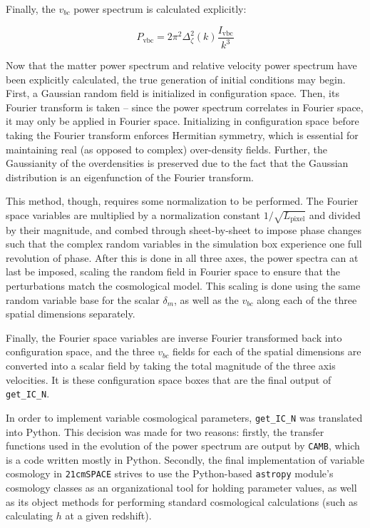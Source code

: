 \documentclass[floats,floatfix,showpacs,amssymb,prd,superscriptaddress,nofootinbib]{revtex4-2} %
\newcommand{\code}{\texttt}
\newcommand{\red}{\textcolor{red}}
\begin{document}
Finally, the $v_{bc}$ power spectrum is calculated explicitly:

\begin{equation}
    P_{\text{vbc}} = 2 \pi^2 \Delta_\zeta ^2 (k) \frac{I_{\text{vbc}}}{k^3}
\end{equation}

Now that the matter power spectrum and relative velocity power spectrum have been explicitly calculated, the true generation of initial conditions may begin. First, a Gaussian random field is initialized in configuration space. Then, its Fourier transform is taken -- since the power spectrum correlates in Fourier space, it may only be applied in Fourier space. Initializing in configuration space before taking the Fourier transform enforces Hermitian symmetry, which is essential for maintaining real (as opposed to complex) over-density fields. Further, the Gaussianity of the overdensities is preserved due to the fact that the Gaussian distribution is an eigenfunction of the Fourier transform. 

This method, though, requires some normalization to be performed. The Fourier space variables are multiplied by a normalization constant $1 / \sqrt{L_{\text{pixel}}}$ and divided by their magnitude, and combed through 
sheet-by-sheet to impose phase changes such that the complex random variables in the simulation box experience one full revolution of phase. After this is done in all three axes, the power spectra can at last be imposed, scaling the random field in Fourier space to ensure that the perturbations match the cosmological model. This scaling is done using the same random variable base for the scalar $\delta_m$, as well as the $v_{bc}$ along each of the three spatial dimensions separately.

Finally, the Fourier space variables are inverse Fourier transformed back into configuration space, and the three $v_{bc}$ fields for each of the spatial dimensions are converted into a scalar field by taking the total magnitude of the three axis velocities. It is these configuration space boxes that are the final output of \code{get\_IC\_N}.

In order to implement variable cosmological parameters, \code{get\_IC\_N} was translated into Python. This decision was made for two reasons: firstly, the transfer functions used in the evolution of the power spectrum are output by \code{CAMB}, which is a code written mostly in Python. Secondly, the final implementation of variable cosmology in \code{21cmSPACE} strives to use the Python-based \code{astropy} module's cosmology classes as an organizational tool for holding parameter values, as well as its object methods for performing standard cosmological calculations (such as calculating $h$ at a given redshift). 
\end{document}
